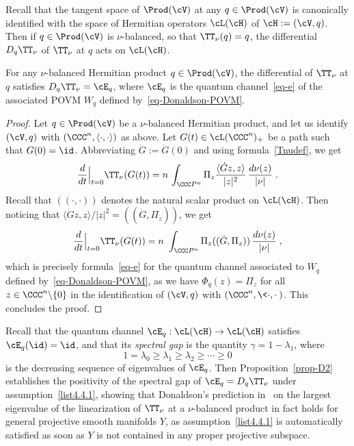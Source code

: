 Recall that the tangent space of $\Prod(\cV)$ at any $q\in\Prod(\cV)$ is canonically identified with the space of Hermitian operators $\cL(\cH)$ of $\cH:=(\cV,q)$. Then if $q\in\Prod(\cV)$ is $\nu$-balanced, so that $\TT_\nu(q)=q$, the differential $D_q\TT_\nu$ of $\TT_\nu$ at $q$ acts on $\cL(\cH)$.

\begin{lemm}\label{prop-D1}
For any
$\nu$-balanced Hermitian product $q\in\Prod(\cV)$, the differential of $\TT_\nu$ at $q$ satisfies $D_q\TT_\nu = \cE_q$, where $\cE_q$ is the quantum channel~\eqref{eq-e} of the associated POVM $W_q$ defined by~\eqref{eq-Donaldson-POVM}.
\end{lemm}

\begin{proof}
Let $q\in\Prod(\cV)$ be a $\nu$-balanced Hermitian product, and let us identify $(\cV,q)$ with $(\CCC^n,\langle\cdot,\cdot\rangle)$ as above. Let $G(t) \in \cL(\CCC^n)_+$ be a path such that $G(0)=\id$. Abbreviating $\dot{G}:=\dot{G}(0)$ and using formula~\eqref{Tnudef}, we get
\[
\frac{d}{dt}\Big |_{t=0} \TT_\nu(G(t)) = n\,\int_{\CCC P^n} \Pi_z \frac{\langle\dot{G}z,z\rangle}{|z|^2}\,\frac{d\nu(z)}{|\nu|}\;.
\]
Recall that $((\cdot,\cdot))$ denotes the natural scalar product on $\cL(\cH)$. Then noticing that $\langle\dot{G}z,z\rangle/|z|^2= ((\dot{G},\Pi_z))$, we get
\[
\frac{d}{dt}\Big |_{t=0} \TT_\nu(G(t)) =
n \ \int_{\CCC P^n} \Pi_z ((\dot{G},\Pi_z))
\,\frac {d\nu(z)}{|\nu|}\;,
\]
which is precisely formula~\eqref{eq-e} for the quantum channel associated to $W_q$ defined by~\eqref{eq-Donaldson-POVM}, as we have $\Phi_q(z)=\Pi_z$ for all $z\in\CCC^n\backslash\{0\}$ in the identification of $(\cV,q)$ with $(\CCC^n,\<\cdot,\cdot\>)$. This concludes the proof.
\end{proof}


Recall that the quantum channel $\cE_q:\cL(\cH)\to\cL(\cH)$ satisfies $\cE_q(\id)=\id$, and that its \emph{spectral gap} is the quantity $\gamma=1-\lambda_1$, where
\begin{equation}
1=\lambda_0\geq\lambda_1\geq\lambda_2\geq\cdots\geq 0
\end{equation}
is the decreasing sequence of eigenvalues of $\cE_q$. Then Proposition~\ref{prop-D2} establishes the positivity of the spectral gap of $\cE_q=D_q\TT_\nu$ under assumption~\eqref{list4.4.1}, showing that Donaldson's prediction in~\cite[Section~4.1]{D} on the largest eigenvalue of the linearization of $\TT_\nu$ at a $\nu$-balanced product in fact holds for general projective smooth manifolds $Y$, as assumption~\eqref{list4.4.1} is automatically satisfied as soon as $Y$ is not contained in any proper projective subspace.

